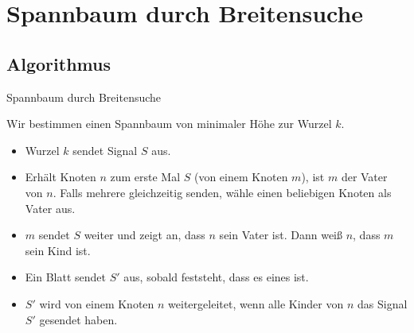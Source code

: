 \documentclass[18pt]{beamer}
\begin{document}

\section{Spannbaum durch Breitensuche}
\subsection{Algorithmus}
\begin{frame}{Spannbaum durch Breitensuche}
	
	Wir bestimmen einen Spannbaum von minimaler Höhe zur Wurzel $k$.
	\begin{itemize}
		\item Wurzel $k$ sendet Signal $S$ aus.
		\item Erhält Knoten $n$ zum erste Mal $S$ (von einem Knoten $m$), ist $m$ der Vater von $n$. Falls mehrere gleichzeitig senden, wähle einen beliebigen Knoten als Vater aus.
		\item $m$ sendet $S$ weiter und zeigt an, dass $n$ sein Vater ist. Dann weiß $n$, dass $m$ sein Kind ist.
		\item Ein Blatt sendet $S'$ aus, sobald feststeht, dass es eines ist. 
		\item $S'$ wird von einem Knoten $n$ weitergeleitet, wenn alle Kinder von $n$ das Signal $S'$ gesendet haben.
	\end{itemize}
\end{frame}
\end{document}
